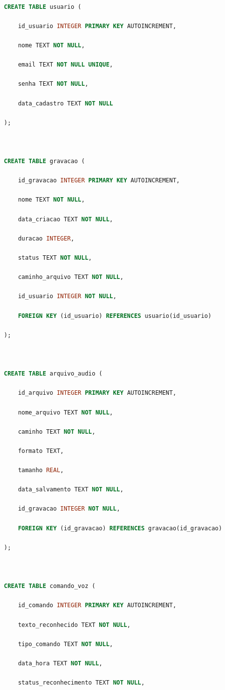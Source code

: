 \documentclass[12pt,oneside,a4paper,brazil,final]{abntex2}
\begin{document}
\begin{lstlisting}[language=SQL]

CREATE TABLE usuario (

    id_usuario INTEGER PRIMARY KEY AUTOINCREMENT,

    nome TEXT NOT NULL,

    email TEXT NOT NULL UNIQUE,

    senha TEXT NOT NULL,

    data_cadastro TEXT NOT NULL

);



CREATE TABLE gravacao (

    id_gravacao INTEGER PRIMARY KEY AUTOINCREMENT,

    nome TEXT NOT NULL,

    data_criacao TEXT NOT NULL,

    duracao INTEGER,

    status TEXT NOT NULL,

    caminho_arquivo TEXT NOT NULL,

    id_usuario INTEGER NOT NULL,

    FOREIGN KEY (id_usuario) REFERENCES usuario(id_usuario)

);



CREATE TABLE arquivo_audio (

    id_arquivo INTEGER PRIMARY KEY AUTOINCREMENT,

    nome_arquivo TEXT NOT NULL,

    caminho TEXT NOT NULL,

    formato TEXT,

    tamanho REAL,

    data_salvamento TEXT NOT NULL,

    id_gravacao INTEGER NOT NULL,

    FOREIGN KEY (id_gravacao) REFERENCES gravacao(id_gravacao)

);



CREATE TABLE comando_voz (

    id_comando INTEGER PRIMARY KEY AUTOINCREMENT,

    texto_reconhecido TEXT NOT NULL,

    tipo_comando TEXT NOT NULL,

    data_hora TEXT NOT NULL,

    status_reconhecimento TEXT NOT NULL,


\end{lstlisting}
\end{document}
